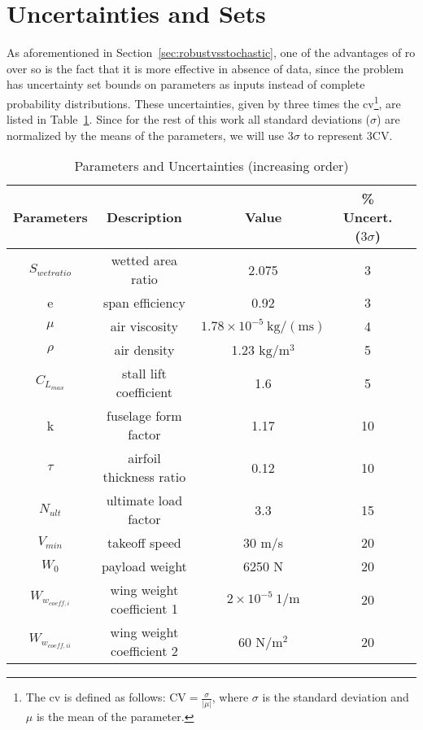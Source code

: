 \section{Uncertainties and Sets}
\label{uncertainties_and_sets}

As aforementioned in Section~\ref{sec:robustvsstochastic}, one of the advantages
of \gls{ro} over \gls{so} is the fact that it is more effective in absence of
data, since the problem has uncertainty set bounds on parameters as inputs instead
of complete probability distributions.
These uncertainties, given by three times the \gls{cv}\footnote{The \gls{cv}
is defined as follows: $\text{CV} = \frac{\sigma}{|\mu|}$, where $\sigma$ is the standard deviation and $\mu$ is the mean of the parameter.},
are listed in Table~\ref{tab:uncertainties}. Since for the rest of this work
all standard deviations ($\sigma$) are normalized by the means of the parameters, we will use $3\sigma$
to represent $3\text{CV}$.

\begin{table}
\begin{center}
\caption{\label{tab:uncertainties} Parameters and Uncertainties (increasing order)}
\begin{tabular}{c c c c c}
\hline
Parameters & Description & Value & \% Uncert. ($3\sigma$) \\
\hline
$S_{wetratio}$ & wetted area ratio & 2.075 & 3\\
e & span efficiency & 0.92 & 3\\
$\mu$ & air viscosity & $1.78 \times 10^{-5}~\mathrm{kg/(ms)}$ & 4 \\
$\rho$ & air density & 1.23 $\mathrm{kg/m^3}$ & 5 \\
$C_{L_{max}}$ & stall lift coefficient & 1.6 & 5\\
k & fuselage form factor & 1.17 & 10\\
$\tau$ & airfoil thickness ratio & 0.12 & 10\\
$N_{ult}$ & ultimate load factor & 3.3 & 15\\
$V_{min}$ & takeoff speed & 30 m/s & 20\\
$W_0$ & payload weight & 6250 N & 20\\
$W_{w_{coeff,i}}$ & wing weight coefficient 1 & $2 \times 10^{-5}~1/\mathrm{m}$ & 20\\
$W_{w_{coeff,ii}}$ & wing weight coefficient 2 & 60 $\mathrm{N/m^2}$ & 20\\
\hline
\end{tabular}
\end{center}
\end{table}

